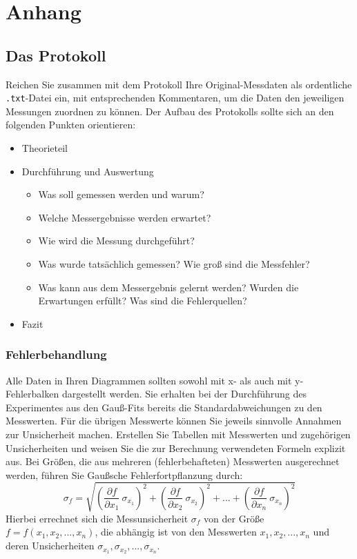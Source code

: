 \newpage
\appendix
%
\section{Anhang}\label{sec:appendix}
%
\subsection{Das Protokoll}
Reichen Sie zusammen mit dem Protokoll Ihre Original-Messdaten als ordentliche \texttt{.txt}-Datei ein, mit entsprechenden Kommentaren, um die Daten den jeweiligen Messungen zuordnen zu können. Der Aufbau des Protokolls sollte sich an den folgenden Punkten orientieren: 
%
\begin{itemize}
	\item Theorieteil
	\item Durchführung und Auswertung
	\begin{itemize}
		\item Was soll gemessen werden und warum?
		\item Welche Messergebnisse werden erwartet?
		\item Wie wird die Messung durchgeführt?
		\item Was wurde tatsächlich gemessen? Wie groß sind die Messfehler?
		\item Was kann aus dem Messergebnis gelernt werden? Wurden die Erwartungen erfüllt? Was sind die Fehlerquellen?
	\end{itemize}
	\item Fazit
\end{itemize}
%
\subsubsection*{Fehlerbehandlung}
Alle Daten in Ihren Diagrammen sollten sowohl mit x- als auch mit y-Fehlerbalken dargestellt werden.
Sie erhalten bei der Durchführung des Experimentes aus den Gauß-Fits bereits die Standardabweichungen zu den Messwerten. 
Für die übrigen Messwerte können Sie jeweils sinnvolle Annahmen zur Unsicherheit machen. 
Erstellen Sie Tabellen mit Messwerten und zugehörigen Unsicherheiten und weisen Sie die zur Berechnung verwendeten Formeln explizit aus.
Bei Größen, die aus mehreren (fehlerbehafteten) Messwerten ausgerechnet werden, führen Sie Gaußsche Fehlerfortpflanzung durch:
\begin{equation}\label{eq:RSS}
	\sigma_{f} = \sqrt{\left( \frac{\partial f}{\partial x_1}\ \sigma_{x_1} \right)^2 + \left( \frac{\partial f}{\partial x_2}\ \sigma_{x_2} \right)^2 + ... + \left( \frac{\partial f}{\partial x_n}\ \sigma_{x_n} \right)^2} 
\end{equation}
Hierbei errechnet sich die Messunsicherheit $\sigma_{f}$ von der Größe $f = f (x_1, x_2, ... , x_n)$, die abhängig ist von den Messwerten $x_1, x_2, ... , x_n$ und deren Unsicherheiten $\sigma_{x_1}, \sigma_{x_2}, ..., \sigma_{x_n}$. 
%
